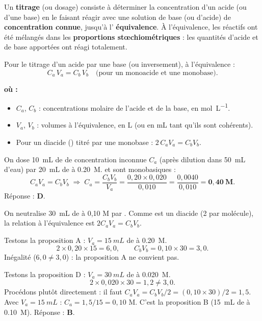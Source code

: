 \documentclass[11pt,a4paper]{article}
\newenvironment{ou}{%
  \par\smallskip\noindent\textbf{où :}\nopagebreak
  \begin{itemize}[leftmargin=1.8em,topsep=2pt,itemsep=1.5pt,parsep=0pt]}%
  {\end{itemize}}
\begin{document}
\begin{definition}
Un \textbf{titrage} (ou dosage) consiste à déterminer la concentration d'un acide (ou d'une base) en le
faisant réagir avec une solution de base (ou d'acide) de \textbf{concentration connue}, jusqu'à l'
\textbf{équivalence}. À l'équivalence, les réactifs ont été mélangés dans les \textbf{proportions
stœchiométriques} : les quantités d'acide et de base apportées ont réagi totalement.
\end{definition}

\begin{formule}
Pour le titrage d'un acide  par une base  (ou inversement), à l'équivalence :
\[ \boxed{C_a\,V_a = C_b\,V_b} \quad\text{(pour un monoacide et une monobase)}. \]
\end{formule}

\begin{ou}
\item $C_a$, $C_b$ : concentrations molaire de l'acide et de la base, en \si{mol.L^{-1}}.
\item $V_a$, $V_b$ : volumes à l'équivalence, en \si{L} (ou en \si{mL} tant qu'ils sont cohérents).
\item Pour un diacide () titré par une monobase : $2\,C_a V_a = C_b V_b$.
\end{ou}

\begin{exemple}
On dose \SI{10}{mL} de  de concentration inconnue $C_a$ (après dilution dans \SI{50}{mL} d'eau) par
\SI{20}{mL} de  à \SI{0,20}{M}.  et  sont monobasiques :
\[ C_a V_a = C_b V_b \;\Longrightarrow\; C_a = \frac{C_b V_b}{V_a} = \frac{0{,}20\times 0{,}020}{0{,}010}
   = \frac{0{,}0040}{0{,}010} = \mathbf{0{,}40\ M}. \]
Réponse : \textbf{D}.
\end{exemple}

\begin{exemple}
On neutralise \SI{30}{mL} de  à 0,10 M par . Comme  est un diacide (2  par
molécule), la relation à l'équivalence est $2 C_a V_a = C_b V_b$.

\smallskip
Testons la proposition A : $V_a = \SI{15}{mL}$ de  à \SI{0,20}{M}.
\[ 2 \times 0{,}20 \times 15 = 6{,}0, \qquad C_b V_b = 0{,}10 \times 30 = 3{,}0. \]
Inégalité ($6{,}0 \neq 3{,}0$) : la proposition A ne convient pas.

\smallskip
Testons la proposition D : $V_a = \SI{30}{mL}$ de  à \SI{0,020}{M}.
\[ 2 \times 0{,}020 \times 30 = 1{,}2 \neq 3{,}0. \]
Procédons plutôt directement : il faut $C_a V_a = C_b V_b/2 = (0{,}10\times30)/2 = 1{,}5$. Avec
$V_a = \SI{15}{mL}$ : $C_a = 1{,}5/15 = 0{,}10$ M. C'est la proposition B (\SI{15}{mL} de  à
\SI{0,10}{M}). Réponse : \textbf{B}.
\end{exemple}
\end{document}
